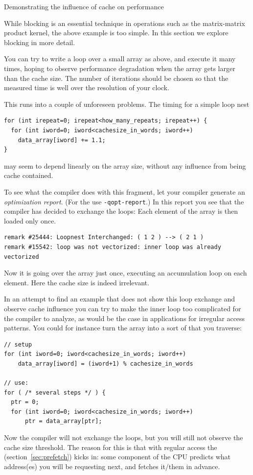  {Demonstrating the influence of cache on performance}

While blocking is an essential technique
in operations such as the matrix-matrix product kernel,
the above example is too simple.
In this section we explore blocking in more detail.

You can try to write a loop over a small array as above, and
execute it many times,
hoping to observe performance degradation when the
array gets larger than the cache size.
The number of iterations should be chosen so that the measured time
is well over the resolution of your clock.

This runs into a couple of unforeseen problems.
The timing for a simple loop nest
\begin{lstlisting}
for (int irepeat=0; irepeat<how_many_repeats; irepeat++) {
  for (int iword=0; iword<cachesize_in_words; iword++)
    data_array[iword] += 1.1;
}    
\end{lstlisting}
may seem to depend linearly on the array size,
without any influence from being cache contained.

To see what the compiler does with this fragment,
let your compiler generate an
\emph{optimization report}.
(For the  use \lstinline[language=shell]{-qopt-report}.)
In this report you see that the compiler has decided to exchange the loops:
Each element of the array is then loaded only once.
\begin{lstlisting}[language=shell]
remark #25444: Loopnest Interchanged: ( 1 2 ) --> ( 2 1 )
remark #15542: loop was not vectorized: inner loop was already vectorized
\end{lstlisting}
Now it is going over the array just once, executing an accumulation loop
on each element. Here the cache size is indeed irrelevant.

In an attempt to find an example that does not show this loop exchange
and observe cache influence
you can try to make the inner loop too complicated
for the compiler to analyze,
as would be the case in applications for irregular access patterns.
You could for instance turn the array into a sort of 
that you traverse:
\begin{lstlisting}
// setup
for (int iword=0; iword<cachesize_in_words; iword++)
    data_array[iword] = (iword+1) % cachesize_in_words

// use:
for ( /* several steps */ ) {
  ptr = 0;
  for (int iword=0; iword<cachesize_in_words; iword++)
      ptr = data_array[ptr];
\end{lstlisting}
Now the compiler will not exchange the loops, but you will still not
observe the cache size threshold.
The reason for this is that with regular access the 
(section~\ref{sec:prefetch}) kicks in:
some component of the CPU predicts what address(es) you will be requesting next,
and fetches it/them in advance.


